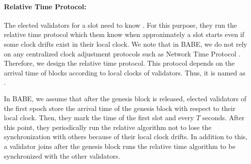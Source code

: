


\paragraph{ Relative Time Protocol:}

The elected validators for a slot need to know . For this purpose, they run the relative time protocol which  them  know when approximately a slot starts even if some clock drifts exist in their local clock. We note that in BABE, we do not rely on any centralized clock adjustment protocols such as  Network Time Protocol \cite{ntp}. Therefore, we design the relative time protocol. This protocol depends on the arrival time of blocks according to local clocks of validators. Thus, it is named as .

In BABE, we assume that after the genesis block is released, elected validators of the first epoch store the arrival time of the genesis block with respect to their local clock. Then, they mark the  time of the first slot and  every $ T $ seconds. After this point,  they periodically run the relative algorithm not to lose the synchronization with others because of their local clock drifts.  In addition to this, a validator  joins after the genesis block runs the relative time algorithm to be synchronized with the other validators.

